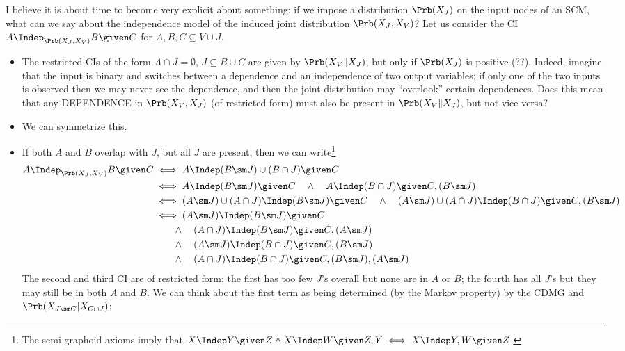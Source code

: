 I believe it is about time to become very explicit about something: if we impose a distribution $\Prb(X_J)$ on the input nodes
of an SCM, what can we say about the independence model of the induced joint distribution $\Prb(X_J,X_V)$? Let us consider the
CI $A \Indep_{\Prb(X_J,X_V)} B \given C$ for $A,B,C \subseteq V\cup J$.
\begin{itemize}
  \item The restricted CIs of the form $A \cap J = \emptyset$, $J \subseteq B \cup C$ are given by $\Prb(X_V \Vert X_J)$,
    but only if $\Prb(X_J)$ is positive (??). Indeed, imagine that the input is binary and switches between a dependence and
    an independence of two output variables; if only one of the two inputs is observed then we may never see the dependence,
    and then the joint distribution may ``overlook'' certain dependences. Does this mean that any DEPENDENCE in $\Prb(X_V,X_J)$ (of restricted form) must also be present in $\Prb(X_V \Vert X_J)$, but not vice versa?
  \item We can symmetrize this.
  \item If both $A$ and $B$ overlap with $J$, but all $J$ are present, then we can write\footnote{The semi-graphoid axioms imply that $X \Indep Y \given Z \land X \Indep W \given Z,Y \iff X \Indep Y,W \given Z$.}
    \begin{equation*}\begin{split}
      A \Indep_{\Prb(X_J,X_V)} B \given C 
    & \iff A \Indep (B\sm J) \cup (B \cap J) \given C \\
    & \iff A \Indep (B\sm J) \given C \quad\land\quad A \Indep (B \cap J) \given C,(B\sm J) \\
      & \iff (A\sm J) \cup (A\cap J) \Indep (B\sm J) \given C \quad\land\quad (A\sm J) \cup (A\cap J) \Indep (B \cap J) \given C,(B\sm J) \\
      & \iff (A\sm J) \Indep (B\sm J) \given C \\
      & \qquad\land\quad (A\cap J) \Indep (B\sm J) \given C,(A\sm J) \\
      & \qquad\land\quad (A\sm J) \Indep (B \cap J) \given C,(B\sm J) \\
      & \qquad\land\quad (A\cap J) \Indep (B \cap J) \given C,(B\sm J),(A\sm J)
    \end{split}\end{equation*}
    The second and third CI are of restricted form; the first has too few $J$'s overall but none are in $A$ or $B$; the fourth has all $J$'s but they may still be in both $A$ and $B$.
    We can think about the first term as being determined (by the Markov property) by the CDMG and $\Prb(X_{J\sm C}|X_{C\cap J})$;

\end{itemize}
